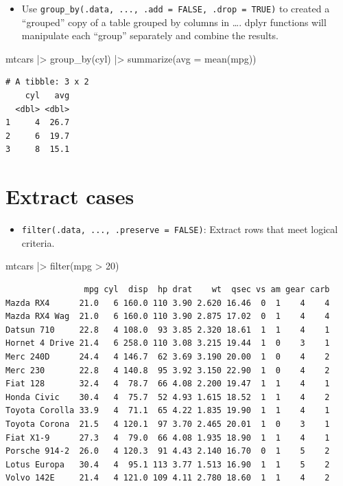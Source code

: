 \documentclass[
  letterpaper,
  DIV=11,
  numbers=noendperiod]{scrreprt}
\newenvironment{Shaded}{\begin{snugshade}}{\end{snugshade}}
\newcommand{\AttributeTok}[1]{\textcolor[rgb]{0.40,0.45,0.13}{#1}}
\newcommand{\DecValTok}[1]{\textcolor[rgb]{0.68,0.00,0.00}{#1}}
\newcommand{\FunctionTok}[1]{\textcolor[rgb]{0.28,0.35,0.67}{#1}}
\newcommand{\NormalTok}[1]{\textcolor[rgb]{0.00,0.23,0.31}{#1}}
\newcommand{\SpecialCharTok}[1]{\textcolor[rgb]{0.37,0.37,0.37}{#1}}
\providecommand{\tightlist}{%
  \setlength{\itemsep}{0pt}\setlength{\parskip}{0pt}}\usepackage{longtable,booktabs,array}
\begin{document}
\begin{itemize}
\tightlist
\item
  Use \texttt{group\_by(.data,\ ...,\ .add\ =\ FALSE,\ .drop\ =\ TRUE)}
  to created a ``grouped'' copy of a table grouped by columns in \ldots.
  dplyr functions will manipulate each ``group'' separately and combine
  the results.
\end{itemize}

\begin{Shaded}
\begin{Highlighting}[]
\NormalTok{mtcars }\SpecialCharTok{|\textgreater{}}
  \FunctionTok{group\_by}\NormalTok{(cyl) }\SpecialCharTok{|\textgreater{}}
  \FunctionTok{summarize}\NormalTok{(}\AttributeTok{avg =} \FunctionTok{mean}\NormalTok{(mpg))}
\end{Highlighting}
\end{Shaded}

\begin{verbatim}
# A tibble: 3 x 2
    cyl   avg
  <dbl> <dbl>
1     4  26.7
2     6  19.7
3     8  15.1
\end{verbatim}

\hypertarget{extract-cases}{%
\chapter{Extract cases}\label{extract-cases}}

\begin{itemize}
\tightlist
\item
  \texttt{filter(.data,\ ...,\ .preserve\ =\ FALSE)}: Extract rows that
  meet logical criteria.
\end{itemize}

\begin{Shaded}
\begin{Highlighting}[]
\NormalTok{mtcars }\SpecialCharTok{|\textgreater{}} \FunctionTok{filter}\NormalTok{(mpg }\SpecialCharTok{\textgreater{}} \DecValTok{20}\NormalTok{)}
\end{Highlighting}
\end{Shaded}

\begin{verbatim}
                mpg cyl  disp  hp drat    wt  qsec vs am gear carb
Mazda RX4      21.0   6 160.0 110 3.90 2.620 16.46  0  1    4    4
Mazda RX4 Wag  21.0   6 160.0 110 3.90 2.875 17.02  0  1    4    4
Datsun 710     22.8   4 108.0  93 3.85 2.320 18.61  1  1    4    1
Hornet 4 Drive 21.4   6 258.0 110 3.08 3.215 19.44  1  0    3    1
Merc 240D      24.4   4 146.7  62 3.69 3.190 20.00  1  0    4    2
Merc 230       22.8   4 140.8  95 3.92 3.150 22.90  1  0    4    2
Fiat 128       32.4   4  78.7  66 4.08 2.200 19.47  1  1    4    1
Honda Civic    30.4   4  75.7  52 4.93 1.615 18.52  1  1    4    2
Toyota Corolla 33.9   4  71.1  65 4.22 1.835 19.90  1  1    4    1
Toyota Corona  21.5   4 120.1  97 3.70 2.465 20.01  1  0    3    1
Fiat X1-9      27.3   4  79.0  66 4.08 1.935 18.90  1  1    4    1
Porsche 914-2  26.0   4 120.3  91 4.43 2.140 16.70  0  1    5    2
Lotus Europa   30.4   4  95.1 113 3.77 1.513 16.90  1  1    5    2
Volvo 142E     21.4   4 121.0 109 4.11 2.780 18.60  1  1    4    2
\end{verbatim}
\end{document}
